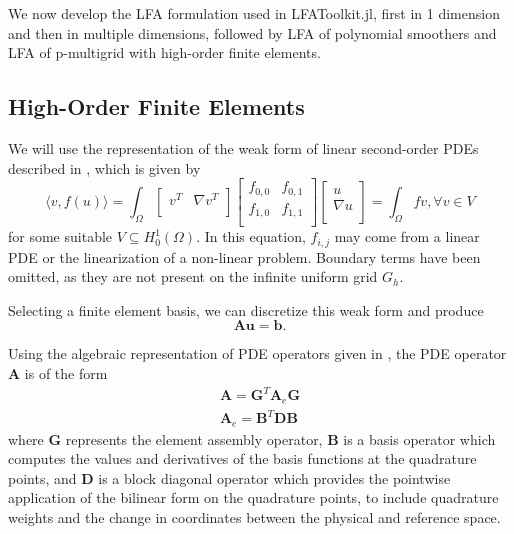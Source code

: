 \documentclass[review]{siamart190516}
\begin{document}
We now develop the LFA formulation used in LFAToolkit.jl, first in 1 dimension and then in multiple dimensions, followed by LFA of polynomial smoothers and LFA of p-multigrid with high-order finite elements.

\subsection{High-Order Finite Elements}\label{sec:highorder}

We will use the representation of the weak form of linear second-order PDEs described in \cite{brown2010efficient}, which is given by
\begin{equation}
\langle v, f \left( u \right) \rangle = \int_{\Omega}
\begin{bmatrix}
  v^T & \nabla v^T    \\
\end{bmatrix}
\begin{bmatrix}
  f_{0, 0} & f_{0, 1} \\
  f_{1, 0} & f_{1, 1} \\
\end{bmatrix}
\begin{bmatrix}
  u                   \\
  \nabla u            \\
\end{bmatrix}
= \int_{\Omega} f v, \forall v \in V
\end{equation}
for some suitable $V \subseteq H_0^1 \left( \Omega \right)$.
In this equation, $f_{i, j}$ may come from a linear PDE or the linearization of a non-linear problem.
Boundary terms have been omitted, as they are not present on the infinite uniform grid $G_h$.

Selecting a finite element basis, we can discretize this weak form and produce
\begin{equation}\label{pdediscrete}
\mathbf{A} \mathbf{u} = \mathbf{b}.
\end{equation}

Using the algebraic representation of PDE operators given in \cite{brown2010efficient}, the PDE operator $\mathbf{A}$ is of the form
\begin{equation}\label{efficienthighorder}
\begin{split}
\mathbf{A} = \mathbf{G}^T \mathbf{A}_e \mathbf{G}\\
\mathbf{A}_e = \mathbf{B}^T \mathbf{D} \mathbf{B}
\end{split}
\end{equation}
where $\mathbf{G}$ represents the element assembly operator, $\mathbf{B}$ is a basis operator which computes the values and derivatives of the basis functions at the quadrature points, and $\mathbf{D}$ is a block diagonal operator which provides the pointwise application of the bilinear form on the quadrature points, to include quadrature weights and the change in coordinates between the physical and reference space.
\end{document}
